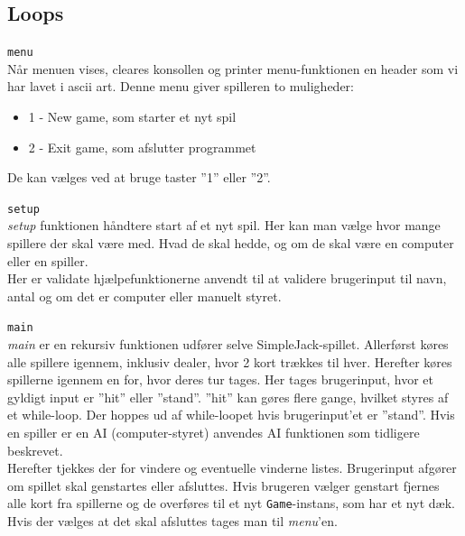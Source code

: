 \documentclass[a4paper]{article}
\begin{document}
    \subsection{Loops} \label{ssec:loops}
    \begin{description}
      \item{\texttt{menu}}~\\
      Når menuen vises, cleares konsollen og printer menu-funktionen en header som
      vi har lavet i ascii art.
      Denne menu giver spilleren to muligheder:
      \begin{itemize}
        \item 1 - New game, som starter et nyt spil
        \item 2 - Exit game, som afslutter programmet
      \end{itemize}
      De kan vælges ved at bruge taster ”1” eller ”2”.

    \item{\texttt{setup}}~\\
      \textit{setup} funktionen håndtere start af et nyt spil. Her kan man
      vælge hvor mange spillere der skal være med. Hvad de skal hedde,
      og om de skal være en computer eller en spiller. \\
      Her er validate hjælpefunktionerne anvendt til at validere brugerinput til navn, antal og om det 
      er computer eller manuelt styret.
      
      \item{\texttt{main}}~\\
      \textit{main} er en rekursiv funktionen udfører selve SimpleJack-spillet. 
      Allerførst køres alle spillere igennem, inklusiv dealer, hvor 2 kort trækkes til hver.
      Herefter køres spillerne igennem en for, hvor deres tur tages. Her tages brugerinput, hvor et 
      gyldigt input er ”hit” eller ”stand”. ”hit” kan gøres flere gange, hvilket styres af et 
      while-loop. Der hoppes ud af while-loopet hvis brugerinput'et er ”stand”.
      Hvis en spiller er en AI (computer-styret) anvendes AI funktionen som tidligere beskrevet.\\
      
      Herefter tjekkes der for vindere og eventuelle vinderne listes.
      Brugerinput afgører om spillet skal genstartes eller afsluttes.
      Hvis brugeren vælger genstart fjernes alle kort fra spillerne og de overføres til et nyt 
      \texttt{Game}-instans, som har et nyt dæk. Hvis der vælges at det skal afsluttes tages man til 
      \textit{menu}'en.
        
    \end{description}
      
\end{document}
